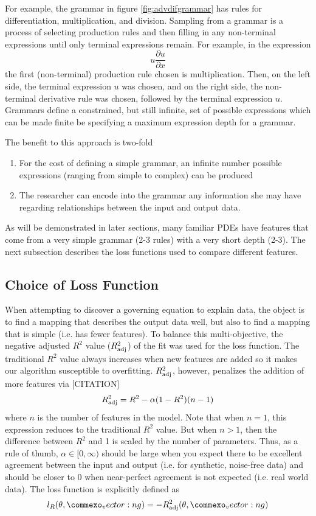 \documentclass{article}
\renewcommand{\vec}[1]{\vect{#1}}
\begin{document}
For example, the grammar in figure \ref{fig:advdifgrammar} has rules for differentiation, multiplication, and division. Sampling from a grammar is a process of selecting production rules and then filling in any non-terminal expressions until only terminal expressions remain. For example, in the expression 
\begin{equation}
    u \frac{\partial u}{\partial x }
\end{equation}
the first (non-terminal) production rule chosen is multiplication. Then, on the left side, the terminal expression $u$ was chosen, and on the right side, the non-terminal derivative rule was chosen, followed by the terminal expression $u$. Grammars define a constrained, but still infinite, set of possible expressions which can be made finite be specifying a maximum expression depth for a grammar. 

The benefit to this approach is two-fold
\begin{enumerate}
    \item For the cost of defining a simple grammar, an infinite number possible expressions (ranging from simple to complex) can be produced
    \item The researcher can encode into the grammar any information she may have regarding relationships between the input and output data.
\end{enumerate}
As will be demonstrated in later sections, many familiar PDEs have features that come from a very simple grammar (2-3 rules) with a very short depth (2-3). The next subsection describes the loss functions used to compare different features.  

\subsection{Choice of Loss Function}
\label{lossfunction}
When attempting to discover a governing equation to explain data, the object is to find a mapping that describes the output data well, but also to find a mapping that is simple (i.e. has fewer features). To balance this multi-objective, the negative adjusted $R^2$ value ($R_{\rm adj}^2$) of the fit was used for the loss function. The traditional $R^2$ value always increases when new features are added so it makes our algorithm susceptible to overfitting. $R_{\rm adj}^2$, however, penalizes the addition of more features via [CITATION]
\[R_{\rm adj}^2 = R^2 - \alpha (1-  R^2)(n-1)\]
where $n$ is the number of features in the model. Note that when $n=1$, this expression reduces to the traditional $R^2$ value. But when $n>1$, then the difference between $R^2$ and 1 is scaled by the number of parameters. Thus, as a rule of thumb, $\alpha \in [0, \infty)$ should be large when you expect there to be excellent agreement between the input and output (i.e. for synthetic, noise-free data) and should be closer to 0 when near-perfect agreement is not expected (i.e. real world data). The loss function is explicitly defined as 
\begin{equation}
    l_R(\theta, \vec{g}) = - R_{\rm adj}^2(\theta, \vec{g})
\end{equation}
\end{document}
